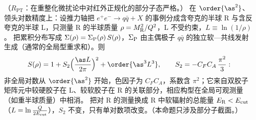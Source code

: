 \begin{proposition}\label{prop:jets-ngl}
（$R_{\mathrm{PT}}$：在重整化微扰论中对红外正规化的部分子态严格。）
在 $\order{\as^2}$、领头对数精度上：设推力轴把 $e^+e^-\to q\bar q+X$ 的事例分成含夸克的半球 R 与含反夸克的半球 L，只测量 R 的半球质量 $\rho=M_{\rm R}^2/Q^2$，L 不受约束，$L\equiv\ln(1/\rho)$。
把累积分布写成 $\Sigma(\rho)=\Sigma_{\rm P}(\rho)\,S(\rho)$，$\Sigma_{\rm P}$ 由主偶极子 $q\bar q$ 的独立软—共线发射生成（通常的全局型重求和）。则
\begin{equation}\label{eq:jets-S2}
S(\rho)=1+S_2\Big(\frac{\as L}{2\pi}\Big)^2+\order{\as^3L^3},\qquad S_2=-C_FC_A\,\frac{\pi^2}{3}:
\end{equation}
非全局对数从 $\order{\as^2}$ 开始，色因子为 $C_FC_A$，系数含 $\pi^2$；它来自双胶子矩阵元中较硬胶子在 L、较软胶子在 R 的关联部分，相应构型在全局可观测量（如重半球质量）中相消。
把对 R 的测量换成 R 中软辐射的总能量 $E_{\rm R}<E_{\rm cut}$（$L=\ln\frac{Q}{2E_{\rm cut}}$），$S_2$ 不变，只有单对数项改变。（本命题只涉及部分子截面。）
\end{proposition}

